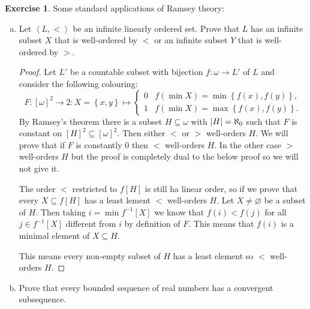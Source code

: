 \documentclass{article}
\theoremstyle{definition}
\newtheorem{question}{Exercise}
\newcommand{\set}[1]{\left\{#1\right\}}
\DeclarePairedDelimiter{\abs}{|}{|}
\begin{document}
\begin{question}
    Some standard applications of Ramsey theory:
    \begin{enumerate}[a.]
        \item Let \(\left< L,<\right>\) be an infinite linearly
              ordered set. Prove that \(L\) has an infinite subset \(X\) that is
              well-ordered by \(<\) or an infinite subset \(Y\) that is
              well-ordered by \(>\).

              \begin{proof}
                  Let \(L'\) be a countable subset with bijection \(f:\omega\to
                  L'\) of \(L\) and consider the following colouring:
                  \[
                      F:[\omega]^{2}\to 2:X=\set{x,y}\mapsto\begin{cases}
                          0 & f(\min X)=\min\set{f(x),f(y)}, \\
                          1 & f(\min X)=\max\set{f(x),f(y)}.
                      \end{cases}
                  \]
                  By Ramsey's theorem there is a subset \(H\subseteq\omega\)
                  with \(\abs{H}=\aleph_{0}\) such that \(F\) is constant on
                  \([H]^{2}\subseteq[\omega]^{2}\). Then either \(<\) or \(>\)
                  well-orders \(H\). We will prove that if \(F\) is constantly
                  \(0\) then \(<\) well-orders \(H\). In the other case \(>\)
                  well-orders \(H\) but the proof is completely dual to the
                  below proof so we will not give it.

                  The order \(<\) restricted to \(f[H]\) is still ha linear
                  order, so if we prove that every \(X\subseteq f[H]\) has a
                  least lement \(<\) well-orders \(H\). Let \(X\neq\varnothing\)
                  be a subset of \(H\). Then taking \(i=\min f^{-1}[X]\) we know
                  that \(f(i)<f(j)\) for all \(j\in f^{-1}[X]\) different from
                  \(i\) by definition of \(F\). This means that \(f(i)\) is a
                  minimal element of \(X\subseteq H\).

                  This means every non-empty subset of \(H\) has a least element
                  so \(<\) well-orders \(H\).
              \end{proof}

        \item Prove that every bounded sequence of real numbers has a convergent
              subsequence.


\end{enumerate}
\end{question}
\end{document}
